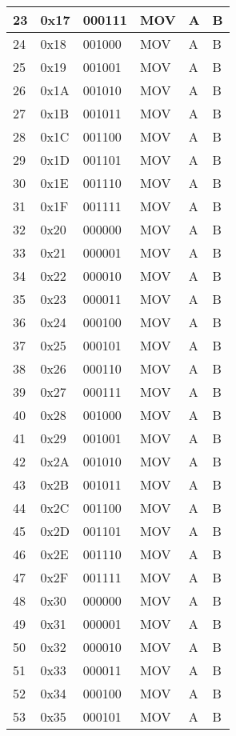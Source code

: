 \documentclass[oneside, a4paper]{memoir}
\begin{document}
\begin{table}[]
\begin{tabular}{|l|l|l|l|l|l|}
23 & 0x17 & 000111 & MOV  & A & B \\ \hline
24 & 0x18 & 001000 & MOV  & A & B \\ \hline
25 & 0x19 & 001001 & MOV  & A & B \\ \hline
26 & 0x1A & 001010 & MOV  & A & B \\ \hline
27 & 0x1B & 001011 & MOV  & A & B \\ \hline
28 & 0x1C & 001100 & MOV  & A & B \\ \hline
29 & 0x1D & 001101 & MOV  & A & B \\ \hline
30 & 0x1E & 001110 & MOV  & A & B \\ \hline
31 & 0x1F & 001111 & MOV  & A & B \\ \hline
32 & 0x20 & 000000 & MOV  & A & B \\ \hline
33 & 0x21 & 000001 & MOV  & A & B \\ \hline
34 & 0x22 & 000010 & MOV  & A & B \\ \hline
35 & 0x23 & 000011 & MOV  & A & B \\ \hline
36 & 0x24 & 000100 & MOV  & A & B \\ \hline
37 & 0x25 & 000101 & MOV  & A & B \\ \hline
38 & 0x26 & 000110 & MOV  & A & B \\ \hline
39 & 0x27 & 000111 & MOV  & A & B \\ \hline
40 & 0x28 & 001000 & MOV  & A & B \\ \hline
41 & 0x29 & 001001 & MOV  & A & B \\ \hline
42 & 0x2A & 001010 & MOV  & A & B \\ \hline
43 & 0x2B & 001011 & MOV  & A & B \\ \hline
44 & 0x2C & 001100 & MOV  & A & B \\ \hline
45 & 0x2D & 001101 & MOV  & A & B \\ \hline
46 & 0x2E & 001110 & MOV  & A & B \\ \hline
47 & 0x2F & 001111 & MOV  & A & B \\ \hline
48 & 0x30 & 000000 & MOV  & A & B \\ \hline
49 & 0x31 & 000001 & MOV  & A & B \\ \hline
50 & 0x32 & 000010 & MOV  & A & B \\ \hline
51 & 0x33 & 000011 & MOV  & A & B \\ \hline
52 & 0x34 & 000100 & MOV  & A & B \\ \hline
53 & 0x35 & 000101 & MOV  & A & B \\ \hline

\end{tabular}
\end{table}
\end{document}
